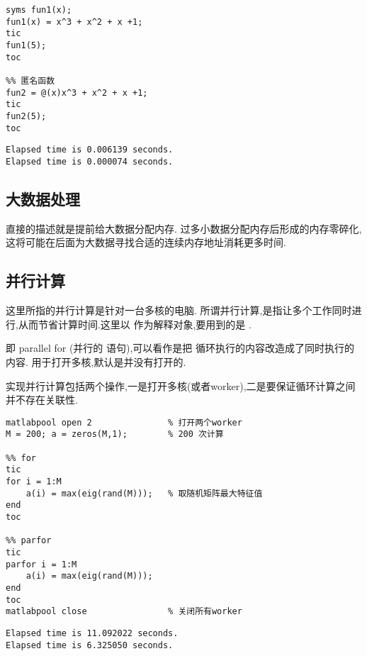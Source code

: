 \vspace{-0.8cm}
\begin{lstlisting}[caption = 不同函数类型效率对比]
%% 符号函数
syms fun1(x);
fun1(x) = x^3 + x^2 + x +1;
tic
fun1(5);
toc

%% 匿名函数
fun2 = @(x)x^3 + x^2 + x +1;
tic
fun2(5);
toc
\end{lstlisting}

\vspace{-0.8cm}
\begin{lstlisting}
Elapsed time is 0.006139 seconds.
Elapsed time is 0.000074 seconds.
\end{lstlisting}



\subsection{大数据处理}
 直接的描述就是提前给大数据分配内存. 过多小数据分配内存后形成的内存零碎化,这将可能在后面为大数据寻找合适的连续内存地址消耗更多时间.



\subsection{并行计算}
 这里所指的并行计算是针对一台多核的电脑.
 所谓并行计算,是指让多个工作同时进行,从而节省计算时间.这里以  作为解释对象,要用到的是 .\par
  即 parallel for (并行的  语句),可以看作是把  循环执行的内容改造成了同时执行的内容.  用于打开多核,默认是并没有打开的.\par
 实现并行计算包括两个操作,一是打开多核(或者worker),二是要保证循环计算之间并不存在关联性.

\vspace{-0.8cm}
\begin{lstlisting}[caption = 并行计算parfor与for效率对比]
matlabpool open 2               % 打开两个worker
M = 200; a = zeros(M,1);        % 200 次计算

%% for
tic  
for i = 1:M        
    a(i) = max(eig(rand(M)));   % 取随机矩阵最大特征值
end 
toc

%% parfor
tic  
parfor i = 1:M 
    a(i) = max(eig(rand(M))); 
end 
toc
matlabpool close                % 关闭所有worker
\end{lstlisting}

\vspace{-0.8cm}
\begin{lstlisting}
Elapsed time is 11.092022 seconds.
Elapsed time is 6.325050 seconds.
\end{lstlisting}

